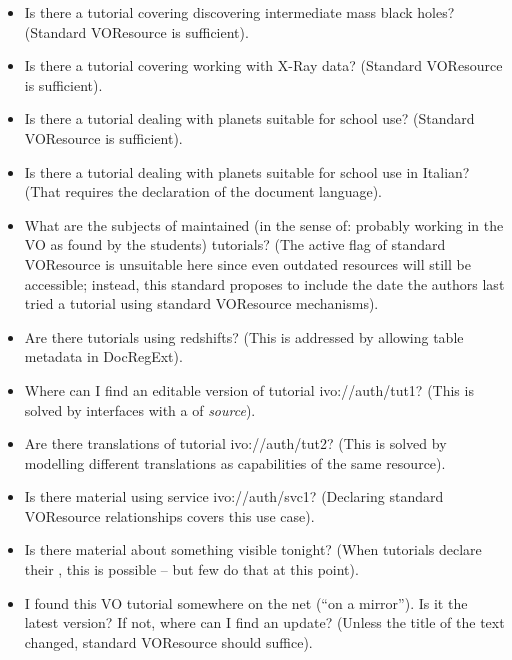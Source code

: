 \documentclass{ivoa}
\begin{document}
\begin{itemize}

\item Is there a tutorial covering discovering intermediate mass black
holes? (Standard VOResource is sufficient).

\item Is there a tutorial covering working with X-Ray data? (Standard
VOResource is sufficient).

\item Is there a tutorial dealing with planets suitable for school use?
(Standard VOResource is sufficient).

\item Is there a tutorial dealing with planets suitable for school use in
Italian? (That requires the declaration of the document language).

\item What are the subjects of maintained (in the sense of: probably
working in the VO as found by the students) tutorials?
(The active flag of standard VOResource is
unsuitable here since even outdated resources will still be accessible;
instead, this standard proposes to include the date the authors last
tried a tutorial using standard VOResource mechanisms).

\item Are there tutorials using redshifts? (This is addressed by allowing
table metadata in DocRegExt).

\item Where can I find an editable version of tutorial ivo://auth/tut1?
(This is solved by interfaces with a  of \textit{source}).

\item Are there translations of tutorial ivo://auth/tut2? (This is
solved by modelling different translations as capabilities of the same
resource).

\item Is there material using service ivo://auth/svc1? (Declaring
standard VOResource relationships covers this use case).

\item Is there material about something visible tonight? (When tutorials
declare their , this is possible -- but few do that at this
point).

\item I found this VO tutorial somewhere on the net (``on a mirror'').  Is it
the latest version?  If not, where can I find an update? (Unless the
title of the text changed, standard VOResource should suffice).

\end{itemize}
\end{document}
